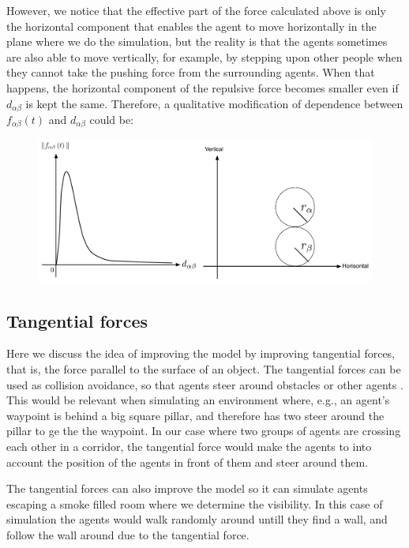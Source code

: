 However, we notice that the effective part of the force calculated above is only the horizontal 
component that enables the agent to move horizontally in the plane where we do the simulation, 
but the reality is that the agents sometimes are also able to move vertically, for example, 
by stepping upon other people when they cannot take the pushing force from the surrounding agents. 
When that happens, the horizontal component of the repulsive force becomes smaller even if 
$d_{\alpha\beta}$ is kept the same.	
Therefore, a qualitative modification of dependence between $ f_{\alpha\beta}(t) $ 
and $ d_{\alpha\beta} $ could be:

\begin{figure}[hb]   
\centering
    {\includegraphics[scale=0.35]{Figures/ForceOverlapping.pdf}} 
    \caption{}
    \label{forceoverlapping}
\end{figure}
 
\subsection{Tangential forces}
Here we discuss the idea of improving the model by improving tangential forces, that 
is, the force parallel to the surface of an object. The tangential forces can be used 
as collision avoidance, so that agents steer around obstacles or other agents \cite{tang1}.
This would be relevant when simulating an environment where, e.g., an agent's waypoint 
is behind a big square pillar, and therefore has two steer around the pillar to ge the 
the waypoint. In our case where two groups of agents are crossing each other in a corridor, 
the tangential force would make the agents to into account the position of the agents in front 
of them and steer around them.

The tangential forces can also improve the model so it can simulate agents escaping a smoke filled 
room where we determine the visibility. In this case of simulation the agents would walk randomly 
around untill they find a wall, and follow the wall around due to the tangential force.